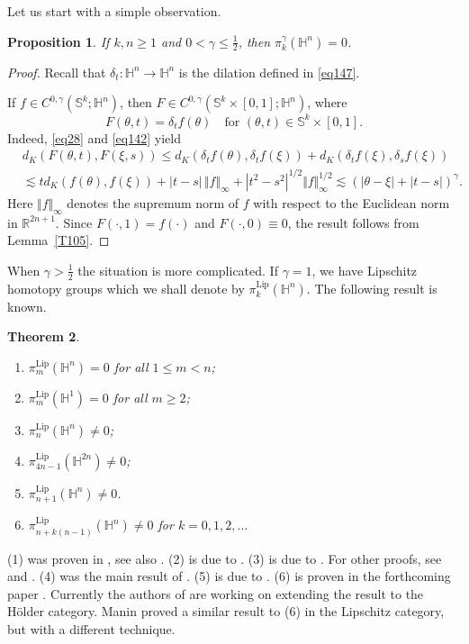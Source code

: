 \documentclass[intlimits,12pt,reqno]{amsart}
\newcommand{\Sph}{\mathbb S}
\newcommand{\bbbh}{\mathbb H}
\newcommand{\R}{\mathbb R}
\numberwithin{equation}{section}
\def\lip{\operatorname{Lip}}
\newtheorem{theorem}{Theorem}[section]
\newtheorem{proposition}[theorem]{Proposition}
\theoremstyle{definition}
\begin{document}
Let us start with a simple observation.
\begin{proposition}
\label{T106}
If $k,n\geq 1$ and $0<\gamma\leq\frac{1}{2}$, then $\pi_k^\gamma(\bbbh^n)=0$.
\end{proposition}
\begin{proof}
Recall that $\delta_t:\bbbh^n\to\bbbh^n$ is the dilation defined in \eqref{eq147}.

If $f\in C^{0,\gamma}(\Sph^k;\bbbh^n)$, then
$F\in C^{0,\gamma}(\Sph^k\times[0,1];\bbbh^n)$, where
$$
F(\theta,t)=\delta_t f(\theta)
\quad
\text{for }
(\theta,t)\in\Sph^k\times[0,1].
$$
Indeed, \eqref{eq28} and \eqref{eq142} yield
\[
\begin{split}
&
d_K(F(\theta,t),F(\xi,s))
\leq d_K(\delta_t f(\theta),\delta_tf(\xi))+d_K(\delta_t f(\xi),\delta_sf(\xi))\\
&\lesssim
td_K(f(\theta),f(\xi))+|t-s|\, \Vert f\Vert_\infty +|t^2-s^2|^{1/2}\Vert f\Vert_\infty^{1/2}
\lesssim
(|\theta-\xi|+|t-s|)^\gamma.
\end{split}
\]
Here $\Vert f\Vert_\infty$ denotes the supremum norm of $f$ with respect to the Euclidean norm in $\R^{2n+1}$.
Since $F(\cdot,1)=f(\cdot)$ and $F(\cdot,0)\equiv0$, the result follows from Lemma~\ref{T105}.
\end{proof}

When $\gamma > \frac{1}{2}$ the situation is more complicated. If $\gamma = 1$, we have Lipschitz homotopy groups which we shall denote by $\pi_k^{\lip}(\mathbb{H}^n)$. The following result is known.
\begin{theorem}${}$
\label{T111}
\begin{enumerate}
 \item $\pi^{\lip}_m(\mathbb{H}^n)=0$ for all $1\leq m<n$;
\item $\pi_m^{\lip}(\mathbb{H}^1)=0$ for all $m\geq 2$;
 \item $\pi^{\lip}_n(\mathbb{H}^n)\neq 0$;
 \item $\pi^{\lip}_{4n-1}(\mathbb{H}^{2n}) \neq 0$; 
 \item $\pi^{\lip}_{n+1}(\mathbb{H}^{n}) \neq 0$. 
 \item $\pi^{\lip}_{n+k(n-1)}(\mathbb{H}^n) \neq 0$ for $k = 0,1,2,\ldots$
\end{enumerate}
 \end{theorem}
(1) was proven in \cite[Theorem~1.1]{WengerY1}, see also \cite[Theorem~4.11]{DHLT}. (2) is due to \cite[Theorem~5]{WengerY2}. (3) is due to \cite{Balogh-Faessler-2009}. For other proofs, see \cite[Theorem~4.11]{DHLT} and \cite[Theorem~1.7]{HST14}. (4) was the main result of \cite{HST14}. (5) is due to \cite{H18}. (6) is proven in the forthcoming paper \cite{EHPS}. Currently the authors of \cite{EHPS} are working on extending the result to the H\"older category. Manin \cite{manin} proved a similar result to (6) in the Lipschitz category, but with a different technique.
\end{document}
